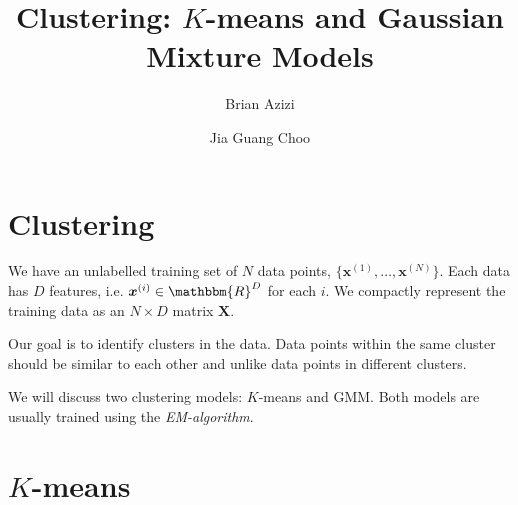 \documentclass[final,3p,times]{elsarticle}
\begin{document}
\begin{frontmatter}



\title{Clustering: $K$-means and Gaussian Mixture Models}


\author{Brian Azizi}
\author{Jia Guang Choo}

\address{Cavendish Laboratory, Department of Physics, J J Thomson
  Avenue, Cambridge. CB3 0HE}

\end{frontmatter}


\section*{Clustering}
\label{sect:Clustering}
We have an unlabelled training set of $N$ data points, $\{\boldsymbol{x}^{(1)}, \dots , \boldsymbol{x}^{(N)} \}$. Each data has $D$ features, i.e. $\boldsymbol{x}^{(i)} \in \mathbbm{R}^D$ for each $i$. We compactly represent the training data as an $N \times D$ matrix $\boldsymbol{X}$.

Our goal is to identify clusters in the data. Data points within the same cluster should be similar to each other and unlike data points in different clusters.

We will discuss two clustering models: $K$-means and GMM.
Both models are usually trained using the \emph{EM-algorithm}.

\section{$K$-means}
\label{sect:Kmeans}
\end{document}
